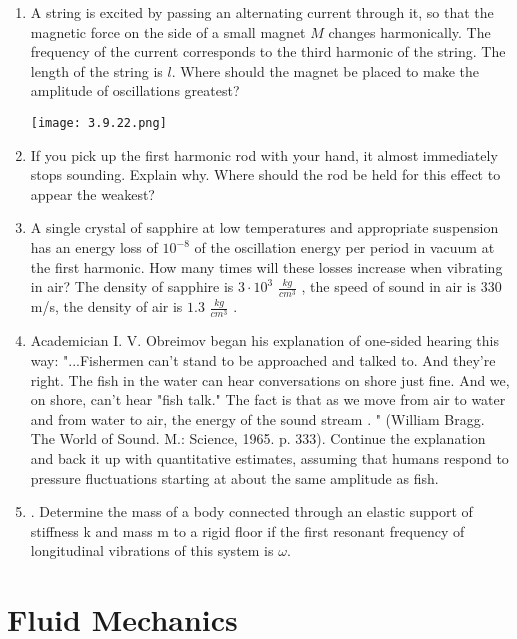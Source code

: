 \documentclass{article}
\begin{document}
\begin{enumerate}[label=3.9.\arabic*]
\item A string is excited by passing an alternating current through it, so that the magnetic force on the side of a small magnet $M$ changes harmonically. The frequency of the current corresponds to the third harmonic of the string. The length of the string is $l$. Where should the magnet be placed to make the amplitude of oscillations greatest?

\begin{center}
    \texttt{[image: 3.9.22.png]}
\end{center}

\item If you pick up the first harmonic rod with your hand, it almost immediately stops sounding. Explain why. Where should the rod be held for this effect to appear the weakest?

\item A single crystal of sapphire at low temperatures and appropriate suspension has an energy loss of $10^{-8}$ of the oscillation energy per period in vacuum at the first harmonic. How many times will these losses increase when vibrating in air? The density of sapphire is $3 \cdot 10^3$ $\frac{k g}{cm^3}$ , the speed of sound in air is $330$ m/s, the density of air is $1.3$ $\frac{k g}{cm^3}$ . 

\item Academician I. V. Obreimov began his explanation of one-sided hearing this way: "...Fishermen can't stand to be approached and talked to. And they're right. The fish in the water can hear conversations on shore just fine. And we, on shore, can't hear "fish talk." The fact is that as we move from air to water and from water to air, the energy of the sound stream . " (William Bragg. The World of Sound. M.: Science, 1965. p. 333). Continue the explanation and back it up with quantitative estimates, assuming that humans respond to pressure fluctuations starting at about the same amplitude as fish.

\item . Determine the mass of a body connected through an elastic support of stiffness k and mass m to a rigid floor if the first resonant frequency of longitudinal vibrations of this system is $\omega$.






\end{enumerate}




\section{Fluid Mechanics}
\end{document}
